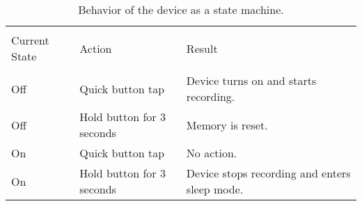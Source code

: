 \begin{table}[h]
\centering
\begin{tabular}{lll}
\hline
\\
Current State & Action                    & Result                                \\[2ex] \hline \\
Off           & Quick button tap          & Device turns on and starts recording. \\[2ex]
Off           & Hold button for 3 seconds & Memory is reset.                       \\[2ex]
On            & Quick button tap          & No action.                             \\[2ex]
On            & Hold button for 3 seconds & Device stops recording and enters sleep mode.\\[2ex] \hline
\end{tabular}
\caption{Behavior of the device as a state machine.}
\label{Tab:ButtonTable}
\end{table}